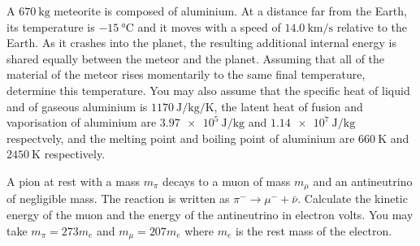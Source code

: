 \begin{problem}
    A $\qty{670}{\kg}$ meteorite is composed of aluminium. At a distance far from the Earth, its temperature is $\qty{-15}{\degreeCelsius}$ and it moves with a speed of $\qty{14.0}{\km\per\s}$ relative to the Earth. As it crashes into the planet, the resulting additional internal energy is shared equally between the meteor and the planet. Assuming that all of the material of the meteor rises momentarily to the same final temperature, determine this temperature. You may also assume that the specific heat of liquid and of gaseous aluminium is $\qty{1170}{\J\per\kg\per\K}$, the latent heat of fusion and vaporisation of aluminium are $\qty{3.97e5}{\J\per\kg}$ and $\qty{1.14e7}{\J\per\kg}$ respectvely, and the melting point and boiling point of aluminium are $\qty{660}{\K}$ and $\qty{2450}{\K}$ respectively.
\end{problem}


\begin{problem}
    A pion at rest with a mass $m_{\pi}$ decays to a muon of mass $m_{\mu}$ and an antineutrino of negligible mass. The reaction is written as $\pi^{-} \rightarrow \mu^{-}+\bar{\nu}$. Calculate the kinetic energy of the muon and the energy of the antineutrino in electron volts. You may take $m_{\pi}=273 m_{e}$ and $m_{\mu}=207 m_{e}$ where $m_{e}$ is the rest mass of the electron.
\end{problem}

